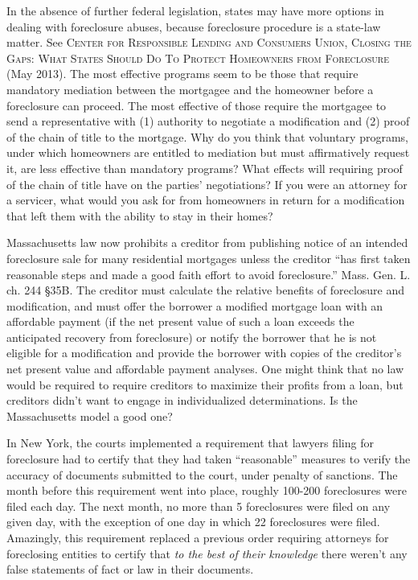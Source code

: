 In the absence of further federal legislation, states may have more options in
dealing with foreclosure abuses, because foreclosure procedure is a state-law
matter. See \textsc{Center for Responsible Lending and Consumers Union,
Closing the Gaps: What States Should Do To Protect Homeowners from Foreclosure}
(May 2013). The most effective programs seem to be those that require
mandatory mediation between the mortgagee and the homeowner before a
foreclosure can proceed. The most effective of those require the mortgagee to
send a representative with (1) authority to negotiate a modification and (2)
proof of the chain of title to the mortgage. Why do you think that voluntary
programs, under which homeowners are entitled to mediation but must
affirmatively request it, are less effective than mandatory programs? What
effects will requiring proof of the chain of title have on the parties'
negotiations? If you were an attorney for a servicer, what would you ask for
from homeowners in return for a modification that left them with the ability to
stay in their homes?

Massachusetts law now prohibits a creditor from publishing notice of an intended
foreclosure sale for many residential mortgages unless the creditor ``has first
taken reasonable steps and made a good faith effort to avoid foreclosure.'' 
Mass. Gen. L. ch. 244 {\S}35B. The creditor must calculate the relative
benefits of foreclosure and modification, and must offer the borrower a
modified mortgage loan with an affordable payment (if the net present value of
such a loan exceeds the anticipated recovery from foreclosure) or notify the
borrower that he is not eligible for a modification and provide the borrower
with copies of the creditor's net present value and affordable payment
analyses. One might think that no law would be required to require creditors
to maximize their profits from a loan, but creditors didn't want to engage in
individualized determinations. Is the Massachusetts model a good one?

In New York, the courts implemented a requirement that lawyers filing for
foreclosure had to certify that they had taken ``reasonable'' measures to
verify the accuracy of documents submitted to the court, under penalty of
sanctions. The month before this requirement went into place, roughly 100-200
foreclosures were filed each day. The next month, no more than 5 foreclosures
were filed on any given day, with the exception of one day in which 22
foreclosures were filed. Amazingly, this requirement replaced a previous order
requiring attorneys for foreclosing entities to certify that \textit{to the
best of their knowledge} there weren't any false statements of fact or law in
their documents. 

